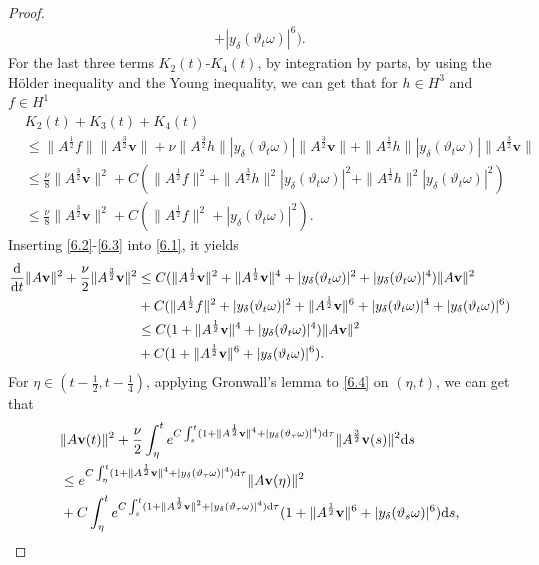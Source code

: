 \documentclass{elsarticle}
\theoremstyle{definition}
\numberwithin{equation}{section}
\renewcommand{\d}{{\rm{d}}}
\begin{document}
\begin{proof}
\begin{align}
+|y_\delta(\vartheta_t\omega)|^6).
\end{align}
For the last three terms $K_2(t)$-$K_{4}(t)$, by integration by parts, by using the H\"{o}lder inequality and the Young inequality, we can get that for $h\in H^3$ and $f\in H^1$
\begin{align}\label{6.3}
&K_{2}(t)+K_{3}(t)+K_{4}(t)\nonumber\\
&\leq\|A^\frac{1}{2}f\|\|A^\frac{3}{2}\textbf{v}\|+\nu\|A^\frac{3}{2}h\||y_\delta(\vartheta_t\omega)|\|A^\frac{3}{2}\textbf{v}\|
+\|A^\frac{1}{2}h\||y_\delta(\vartheta_t\omega)|\|A^\frac{3}{2}\textbf{v}\|\nonumber\\
&\leq \frac\nu8\|A^\frac{3}{2}\textbf{v}\|^2+C(\|A^\frac{1}{2}f\|^2+\|A^\frac{3}{2}h\|^2|y_\delta(\vartheta_t\omega)|^2
+\|A^\frac{1}{2}h\|^2|y_\delta(\vartheta_t\omega)|^2)\nonumber\\
&\leq \frac\nu8\|A^\frac{3}{2}\textbf{v}\|^2+C(\|A^\frac{1}{2}f\|^2+|y_\delta(\vartheta_t\omega)|^2
).
\end{align}
Inserting \eqref{6.2}-\eqref{6.3} into \eqref{6.1}, it yields
\begin{align}\label{6.4}
\frac{\d}{\d t}\|A\textbf{v}\|^2+\frac{\nu}{2}\|A^\frac{3}{2}\textbf{v}\|^2&\leq C(\|A^{\frac{1}{2}}\textbf{v}\|^2
+\|A^{\frac{1}{2}}\textbf{v}\|^4+|y_\delta(\vartheta_t\omega)|^2+|y_\delta(\vartheta_t\omega)|^4)\|A\textbf{v}\|^2\nonumber\\
&+C(\|A^\frac{1}{2}f\|^2+|y_\delta(\vartheta_t\omega)|^2+\|A^{\frac{1}{2}}\textbf{v}\|^6+|y_\delta(\vartheta_t\omega)|^4
+|y_\delta(\vartheta_t\omega)|^6)\nonumber\\
&\leq C(1+\|A^{\frac{1}{2}}\textbf{v}\|^4+|y_\delta(\vartheta_t\omega)|^4)\|A\textbf{v}\|^2\nonumber\\
&+C(1+\|A^{\frac{1}{2}}\textbf{v}\|^6+|y_\delta(\vartheta_t\omega)|^6).
\end{align}
For  $\eta\in(t-\frac{1}{2},t-\frac{1}{4})$,  applying Gronwall's lemma to \eqref{6.4} on $(\eta,t)$, we can get that
\begin{align*}
&\|A\textbf{v}(t)\|^2+\frac\nu2\int_\eta^te^{C\int_s^t(1+\|A^\frac12\textbf{v}\|^4+|y_\delta(\vartheta_\tau\omega)|^4)\d\tau}
\|A^\frac{3}{2}\textbf{v}(s)\|^2 \d s\nonumber\\
&\leq
e^{C\int_\eta^t(1+\|A^\frac12\textbf{v}\|^4+|y_\delta(\vartheta_\tau\omega)|^4)\d\tau}\|A\textbf{v}(\eta)\|^2\nonumber\\
&+C\int_\eta^te^{C\int_s^t(1+\|A^\frac12\textbf{v}\|^2+|y_\delta(\vartheta_\tau\omega)|^4)\d\tau}
(1+\|A^{\frac{1}{2}}\textbf{v}\|^6+|y_\delta(\vartheta_s\omega)|^6)\d s,

\end{align*}
\end{proof}
\end{document}
